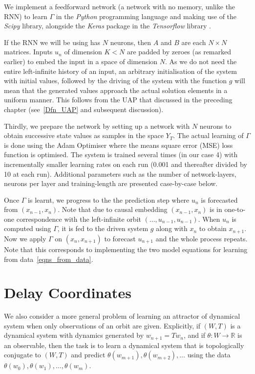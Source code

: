 We implement a feedforward network (a network with no memory, unlike the RNN) to learn $\Gamma$ in the \emph{Python} programming language and making use of the \emph{Scipy} library, alongside the \emph{Keras} package in the \emph{Tensorflow} library .

If the RNN we will be using has $N$ neurons, then $A$ and $B$ are each $N\times{N}$ matrices. Inputs $u_n$ of dimension $K < N$ are padded by zeroes (as remarked earlier) to embed the input in a space of dimension $N$. 
As we do not need the entire left-infinite history of an input, an arbitrary initialisation of the system with initial values, followed by the driving of the system with the function $g$ will mean that the generated values approach the actual solution elements in a uniform manner. This follows from the UAP that discussed in the preceding chapter (see~\ref{Dfn_UAP} and subsequent discussion).

Thirdly, we prepare the network by setting up a network with $N$ neurons  to obtain successive state values as samples in the space $Y_T$. 
The actual learning of $\Gamma$ is done using the Adam Optimiser where the means square error (MSE) loss function is optimised. 
The system is trained several times (in our case 4) with incrementally smaller learning rates on each run (0.001 and thereafter divided by 10 at each run). 
Additional parameters such as the number of network-layers, neurons per layer and training-length are presented case-by-case below.

Once $\Gamma$ is learnt, we progress to the the prediction step where $u_n$ is forecasted from $(x_{n-1},x_{n})$. Note that  due to causal embedding $(x_{n-1},x_{n})$ is in one-to-one correspondence with the left-infinite orbit $(\ldots,u_{n-1},u_{n-1})$. 
When $u_n$ is computed using $\Gamma$, it is fed to the driven system $g$ along with  $x_n$ to obtain $x_{n+1}$. Now we apply $\Gamma$ on $(x_n,x_{n+1})$ to forecast $u_{n+1}$ and the whole process repeats. Note that this corresponds to implementing the two model equations for learning from data~\eqref{eqns_from_data}.

\section{Delay Coordinates}

We also consider a more general problem of learning an attractor of dynamical system when only observations of an orbit are given. 
Explicitly, if $(W,T)$ is a dynamical system with dynamics generated by $w_{n+1}=Tw_n$, and if $\theta:W \to \mathbb{R}$ is an observable, then the task is to learn a dynamical system that is topologically conjugate to $(W,T)$ and predict $\theta(w_{m+1}),\theta(w_{m+2}),\ldots$ using the data $\theta(w_{0}),\theta(w_{1}),\ldots,\theta(w_{m})$.  

